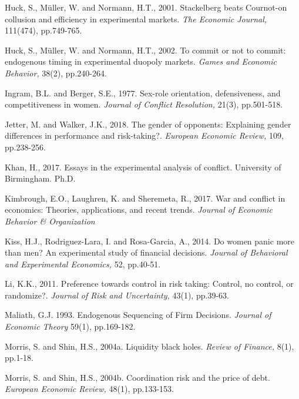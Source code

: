 \documentclass[11pt, letterpaper]{article}
\theoremstyle{plain}
\begin{document}
\begin{thebibliography}{10}
\bibitem{}Huck, S., M\"{u}ller, W. and Normann, H.T., 2001. Stackelberg beats Cournot-on collusion and efficiency in experimental markets. \textit{The Economic Journal,} 111(474), pp.749-765.

\bibitem{}Huck, S., M\"{u}ller, W. and Normann, H.T., 2002. To commit or not to commit: endogenous timing in experimental duopoly markets. \textit{Games and Economic Behavior,} 38(2), pp.240-264.

\bibitem{} Ingram, B.L. and Berger, S.E., 1977. Sex-role orientation, defensiveness, and competitiveness in women. \textit{Journal of Conflict Resolution,} 21(3), pp.501-518.

\bibitem{} Jetter, M. and Walker, J.K., 2018. The gender of opponents: Explaining gender differences in performance and risk-taking?. \textit{European Economic Review,} 109, pp.238-256.

\bibitem{} Khan, H., 2017. Essays in the experimental analysis of conflict. University of Birmingham. Ph.D.

\bibitem{} Kimbrough, E.O., Laughren, K. and Sheremeta, R., 2017. War and conflict in economics: Theories, applications, and recent trends. \textit{Journal of Economic Behavior \& Organization}

\bibitem{} Kiss, H.J., Rodriguez-Lara, I. and Rosa-Garcia, A., 2014. Do women panic more than men? An experimental study of financial decisions. \textit{Journal of Behavioral and Experimental Economics,} 52, pp.40-51.

\bibitem{} Li, K.K., 2011. Preference towards control in risk taking: Control, no control, or randomize?. \textit{Journal of Risk and Uncertainty,} 43(1), pp.39-63.



\bibitem{} Maliath, G.J. 1993. Endogenous Sequencing of Firm Decisions. \textit{Journal of Economic Theory} 59(1), pp.169-182. 

\bibitem{} Morris, S. and Shin, H.S., 2004a. Liquidity black holes. \textit{Review of Finance,} 8(1), pp.1-18.

\bibitem{}  Morris, S. and Shin, H.S., 2004b. Coordination risk and the price of debt. \textit{European Economic Review,} 48(1), pp.133-153.


\end{thebibliography}
\end{document}
